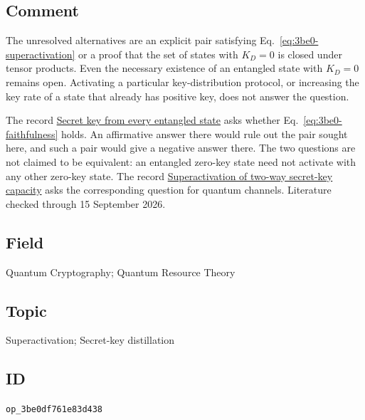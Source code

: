 \subsection*{Comment}

The unresolved alternatives are an explicit pair satisfying
Eq.~\eqref{eq:3be0-superactivation} or a proof that the set of states with
$K_D=0$ is closed under tensor products.  Even the necessary existence of an
entangled state with $K_D=0$ remains open.  Activating a particular
key-distribution protocol, or increasing the key rate of a state that already
has positive key, does not answer the question.

The record \href{https://qiqc-op.com/problem/op_b952ec2dd8246a10/}{Secret key
from every entangled state} asks whether Eq.~\eqref{eq:3be0-faithfulness}
holds.  An affirmative answer there would rule out the pair sought here, and
such a pair would give a negative answer there.  The two questions are not
claimed to be equivalent: an entangled zero-key state need not activate with
any other zero-key state.  The record
\href{https://qiqc-op.com/problem/op_59e9ede6e282a917/}{Superactivation of
two-way secret-key capacity} asks the corresponding question for quantum
channels.  Literature checked through 15 September 2026.

\subsection*{Field}

Quantum Cryptography; Quantum Resource Theory

\subsection*{Topic}

Superactivation; Secret-key distillation

\subsection*{ID}

\texttt{op\_3be0df761e83d438}
